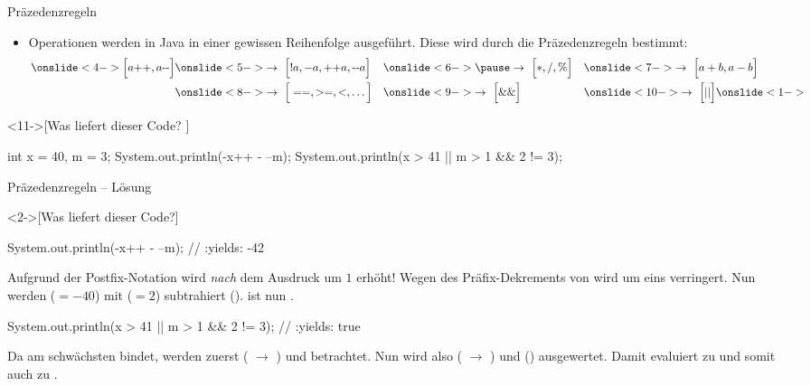 \begin{frame}[fragile]{Präzedenzregeln}
    \begin{itemize}[<+(1)->]
        \widei
        \item Operationen werden in Java in einer gewissen Reihenfolge ausgeführt.\pause{} Diese wird durch die Präzedenzregeln bestimmt:
        \begin{alignat*}{3}
            \onslide<4->{\Big[a\text{++},a\text{-\!\! -}\Big]}&\onslide<5->{\to~\Big[!a, -a, \text{++}a,\text{-\!\! -}a\Big]}&&\onslide<6->{\pause\to~\Big[*,/,\%\Big]} &&\onslide<7->{\to~\Big[a+b,a-b\Big]}\\
            &\onslide<8->{\to~\Big[==,>=,<,\ldots\Big]} &&\onslide<9->{\to~\Big[\&\&\Big]}&&\onslide<10->{\to~\Big[||\Big]}\onslide<1->
        \end{alignat*}
        \vspace*{-0.5cm}
    \end{itemize}
\ifull
    \begin{exercise}<11->[Was liefert dieser Code? ]
        \begin{plainjava}[columns={[c]fullflexible}]
int x = 40, m = 3;
System.out.println(-x++ - --m);
System.out.println(x > 41 || m > 1 && 2 != 3);
        \end{plainjava}
    \end{exercise}
    \fi{}
\end{frame}

\ifull
\begin{frame}[fragile,c]{Präzedenzregeln -- Lösung}
    \begin{solve}<2->[Was liefert dieser Code?]
        \pause{}\begin{plainjava}[columns={[c]fullflexible}]
System.out.println(-x++ - --m); // :yields: -42
        \end{plainjava}
        \pause{}Aufgrund der Postfix-Notation  wird  \emph{nach} dem Ausdruck um \(1\) erhöht!\pause{} Wegen des Präfix-Dekrements von  wird  um eins verringert.\pause{} Nun werden  (\(=-40\)) mit  (\(= 2\)) subtrahiert ().\pause{}  ist nun .
        \begin{plainjava}[columns={[c]fullflexible}]
System.out.println(x > 41 || m > 1 && 2 != 3); // :yields: true
        \end{plainjava}
        Da \bjava{||} am schwächsten bindet,\pause{} werden zuerst  ( \(\to\) ) und  betrachtet.\pause{} Nun wird also  ( \(\to\) ) und  () ausgewertet.\pause{} Damit evaluiert  zu  und somit auch  zu .
    \end{solve}
\end{frame}

